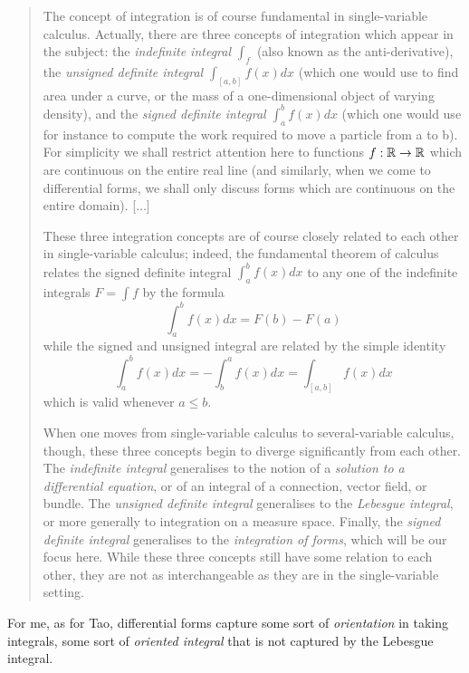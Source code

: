 \documentclass[a4paper, 11pt]{article}
\begin{document}
\begin{quotation}
    The concept of integration is of course fundamental in single-variable calculus.
Actually, there are three concepts of integration which appear in the subject: the \textit{indefinite integral} $\int_f$ (also known as the anti-derivative), the \textit{unsigned definite integral} $\int_{[a, b]} f(x) dx$ (which one would use to find area under a curve, or the mass of a one-dimensional object of varying density), and the \textit{signed definite integral} $\int_a^b f(x) dx$ (which one would use for instance to compute the work required to move a particle from a to b). For simplicity we shall restrict attention here to functions $f: \mathbb{R} \to \mathbb{R}$ which are continuous on the entire real line (and similarly, when we come to differential forms, we shall only discuss forms which are continuous on the entire domain). [$\ldots$]

These three integration concepts are of course closely related to each other in single-variable calculus; indeed, the fundamental theorem of calculus relates the signed definite integral $\int_a^b f(x) dx$ to any one of the indefinite integrals $F = \int f$ by the formula \begin{equation*}
\int_a^b f(x) dx = F(b) - F(a)
\end{equation*}
while the signed and unsigned integral are related by the simple identity \begin{equation*}
\int_a^b f(x) dx = -\int_b^a f(x) dx = \int_{[a,b]} f(x) dx
\end{equation*}
which is valid whenever $a \leq b$.

When one moves from single-variable calculus to several-variable calculus, though,
these three concepts begin to diverge significantly from each other. The \textit{indefinite integral} generalises to the notion of a \textit{solution to a differential equation}, or of an integral of a connection, vector field, or bundle. The \textit{unsigned definite integral} generalises to the \textit{Lebesgue integral}, or more generally to integration on a measure space. Finally, the \textit{signed definite integral} generalises to the \textit{integration of forms}, which will be our focus here. While these three concepts still have some relation to each other, they are not as interchangeable as they are in the single-variable setting.
\end{quotation}

For me, as for Tao, differential forms capture some sort of \textit{orientation} in taking integrals, some sort of \textit{oriented integral} that is not captured by the Lebesgue integral.
\end{document}
